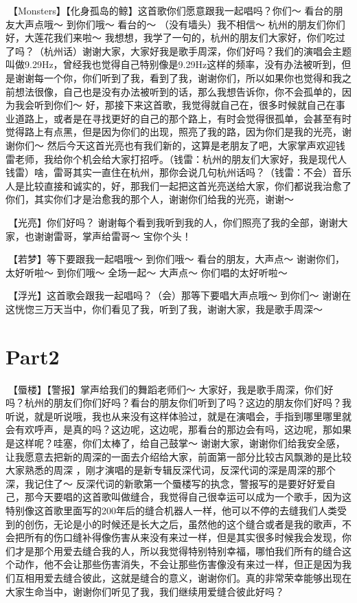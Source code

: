 \documentclass[
]{book}
\begin{document}
🎵【Monsters】【化身孤岛的鲸】这首歌你们愿意跟我一起唱吗？你们～ 看台的朋友大声点哦～ 到你们哦～ 看台的～ （没有墙头）我不相信～
杭州的朋友们你们好，大莲花我们来啦～ 我想想，我学了一句的，杭州的朋友们大家好，你们吃过了吗？（杭州话）谢谢大家，大家好我是歌手周深，你们好吗？我们的演唱会主题叫做9.29Hz，曾经我也觉得自己特别像是9.29Hz这样的频率，没有办法被听到，但是谢谢每一个你，你们听到了我，看到了我，谢谢你们，所以如果你也觉得和我之前想法很像，自己也是没有办法被听到的话，那么我想告诉你，你不会孤单的，因为我会听到你们～
好，那接下来这首歌，我觉得就自己在，很多时候就自己在事业道路上，或者是在寻找更好的自己的那个路上，有时会觉得很孤单，会甚至有时觉得路上有点黑，但是因为你们的出现，照亮了我的路，因为你们是我的光亮，谢谢你们～ 然后今天这首光亮也有我们新的，这算是老朋友了吧，大家掌声欢迎钱雷老师，我给你个机会给大家打招呼。（钱雷：杭州的朋友们大家好，我是现代人钱雷）啥，雷哥其实一直住在杭州，那你会说几句杭州话吗？（钱雷：不会）音乐人是比较直接和诚实的，好，那我们一起把这首光亮送给大家，你们都说我治愈了你们，其实你们才是治愈我的那个人，谢谢你们给我的光亮，谢谢～

🎵【光亮】你们好吗？ 谢谢每个看到我听到我的人，你们照亮了我的全部，谢谢大家，也谢谢雷哥，掌声给雷哥～
宝你个头！

🎵【若梦】等下要跟我一起唱哦～ 到你们哦～ 看台的朋友，大声点～ 谢谢你们，太好听啦～ 到你们哦～ 全场一起～ 大声点～ 你们唱的太好听啦～

🎵【浮光】这首歌会跟我一起唱吗？（会）那等下要唱大声点哦～ 到你们～ 谢谢在这恍惚三万天当中，你们看见了我，听到了我，谢谢大家，我是歌手周深～

\section{Part2}\label{hangzhou-20240823-part2}

🎵【蜃楼】【警报】掌声给我们的舞蹈老师们～
大家好，我是歌手周深，你们好吗？杭州的朋友们你们好吗？看台的朋友你们听到了吗？这边的朋友你们好吗？我听说，就是听说哦，我也从来没有这样体验过，就是在演唱会，手指到哪里哪里就会有欢呼声，是真的吗？这边呢，这边呢，那看台的那边会有吗，这边呢，那如果是这样呢？哇塞，你们太棒了，给自己鼓掌～ 谢谢大家，谢谢你们给我安全感，让我愿意去把新的周深的一面去介绍给大家，前面第一部分比较古风飘渺的是比较大家熟悉的周深 ，刚才演唱的是新专辑反深代词，反深代词的深是周深的那个深，我记住了～ 反深代词的新歌第一个蜃楼写的执念，警报写的是要好好爱自己，那今天要唱的这首歌叫做缝合，我觉得自己很幸运可以成为一个歌手，因为这特别像这首歌里面写的200年后的缝合机器人一样，他可以不停的去缝我们人类受到的创伤，无论是小的时候还是长大之后，虽然他的这个缝合或者是我的歌声，不会把所有的伤口缝补得像伤害从来没有来过一样，但是其实很多时候我会发现，你们才是那个用爱去缝合我的人，所以我觉得特别特别幸福，哪怕我们所有的缝合这个动作，他不会让那些伤害消失，不会让那些伤害像没有来过一样，但正是因为我们互相用爱去缝合彼此，这就是缝合的意义，谢谢你们。真的非常荣幸能够出现在大家生命当中，谢谢你们听见了我，我们继续用爱缝合彼此好吗？
\end{document}
